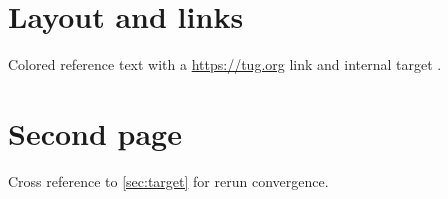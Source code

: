 \documentclass{article}
\begin{document}
\section{Layout and links}
Colored \textcolor{btblue}{reference text} with a
\url{https://tug.org} link and internal target \label{sec:target}.
\newpage
\section{Second page}
Cross reference to \ref*{sec:target} for rerun convergence.
\end{document}
